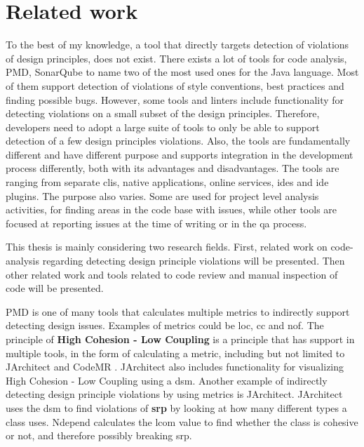\documentclass{report}
\begin{document}
\chapter{Related work}
\label{relatedwork}

To the best of my knowledge, a tool that directly targets detection of violations of design principles, does not exist. There exists a lot of tools for code analysis, PMD\cite{pmd}, SonarQube\cite{sonarqube} to name two of the most used ones for the Java language. Most of them support detection of violations of style conventions, best practices and finding possible bugs. However, some tools and linters include functionality for detecting violations on a small subset of the design principles. Therefore, developers need to adopt a large suite of tools to only be able to support detection of a few design principles violations. Also, the tools are fundamentally different and have different purpose and supports integration in the development process differently, both with its advantages and disadvantages. The tools are ranging from separate \gls{cli}s, native applications, online services, \gls{ide}s and \gls{ide} plugins. The purpose also varies. Some are used for project level analysis activities, for finding areas in the code base with issues, while other tools are focused at reporting issues at the time of writing or in the \gls{qa} process. 

This thesis is mainly considering two research fields. First, related work on code-analysis regarding detecting design principle violations will be presented. Then other related work and tools related to code review and manual inspection of code will be presented.

PMD \cite{pmd} is one of many tools that calculates multiple metrics to indirectly support detecting design issues. Examples of metrics could be \gls{loc}, \gls{cc} and \gls{nof}. The principle of \textbf{High Cohesion - Low Coupling} is a principle that has support in multiple tools, in the form of calculating a metric, including but not limited to JArchitect \cite{jarchitect} and CodeMR \cite{codemr}. JArchitect \cite{jarchitect} also includes functionality for visualizing  High Cohesion - Low Coupling using a \gls{dsm}. Another example of indirectly detecting design principle violations by using metrics is JArchitect. JArchitect uses the \gls{dsm} to find violations of \textbf{\gls{srp}} by looking at how many different types a class uses. Ndepend \cite{ndepend} calculates the \gls{lcom} value to find whether the class is cohesive or not, and therefore possibly breaking \gls{srp}. 
\end{document}
